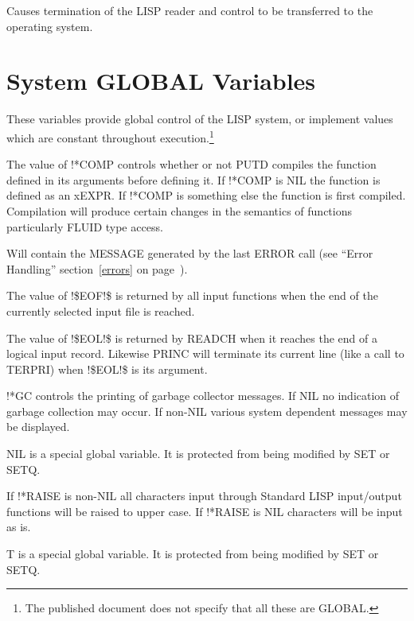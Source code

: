 \documentclass[11pt,letterpaper]{book}
\begin{document}
{Causes termination of the LISP reader and control to be transferred
to the operating system.}

\section{System GLOBAL Variables}
\label{slglobals}

These variables provide global control of the LISP system, or
implement values which are constant throughout execution.\footnote{The
published document does not specify that all these are GLOBAL.}


{The value of !*COMP controls whether or not PUTD compiles the
function defined in its arguments before defining it. If !*COMP is NIL
the function is defined as an xEXPR. If !*COMP is something else the
function is first compiled. Compilation will produce certain changes
in the semantics of functions particularly FLUID type access.}


{Will contain the MESSAGE generated by the last ERROR call (see
``Error Handling'' section~\ref{errors} on page~\pageref{errors}).}


{The value of !\$EOF!\$ is returned by all input functions when the
end
of the currently selected input file is reached.}


{The value of !\$EOL!\$ is returned by READCH when it reaches the end
of
  
a logical input record. Likewise PRINC will terminate its current line
(like a call to TERPRI) when !\$EOL!\$ is its argument.}

{!*GC controls the printing of garbage collector messages.  If NIL no
indication of garbage collection may occur.  If non-NIL various system
dependent messages may be displayed.}


{NIL is a special global variable. It is protected from being modified
by SET or SETQ.
}


{If !*RAISE is non-NIL all characters input through Standard LISP
input/output functions will be raised to upper case. If !*RAISE is NIL
characters will be input as is.}


{T is a special global variable. It is protected from being modified
by SET or SETQ. }
\end{document}
